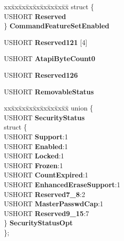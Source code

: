 \begin{DoxyCompactItemize}
\begin{tabbing}
\end{tabbing}\item 
\mbox{\label{struct___i_d_e_n_t_i_f_y___d_a_t_a_a7c0001190945ee865c9445676e84176f}} 
\begin{tabbing}
xx\=xx\=xx\=xx\=xx\=xx\=xx\=xx\=xx\=\kill
struct \{\\
\>USHORT {\bfseries Reserved}\\
\} {\bfseries CommandFeatureSetEnabled}\\

\end{tabbing}\item 
\mbox{\label{struct___i_d_e_n_t_i_f_y___d_a_t_a_a96c3aa79eba3a0c0558bce88a3ea196b}} 
U\+S\+H\+O\+RT {\bfseries Reserved121} \mbox{[}4\mbox{]}
\item 
\mbox{\label{struct___i_d_e_n_t_i_f_y___d_a_t_a_a55df19f7318d27bad2106d0762d8b2ec}} 
U\+S\+H\+O\+RT {\bfseries Atapi\+Byte\+Count0}
\item 
\mbox{\label{struct___i_d_e_n_t_i_f_y___d_a_t_a_a484968cff84e81d7e76e9d0a099a0a08}} 
U\+S\+H\+O\+RT {\bfseries Reserved126}
\item 
\mbox{\label{struct___i_d_e_n_t_i_f_y___d_a_t_a_ad239ea0207c52d65c73d202eb9fc48c4}} 
U\+S\+H\+O\+RT {\bfseries Removable\+Status}
\item 
\mbox{\label{struct___i_d_e_n_t_i_f_y___d_a_t_a_aa4f91fcd48e21fe54b819add87d5254f}} 
\begin{tabbing}
xx\=xx\=xx\=xx\=xx\=xx\=xx\=xx\=xx\=\kill
union \{\\
\>USHORT {\bfseries SecurityStatus}\\
\>struct \{\\
\>\>USHORT {\bfseries Support}:1\\
\>\>USHORT {\bfseries Enabled}:1\\
\>\>USHORT {\bfseries Locked}:1\\
\>\>USHORT {\bfseries Frozen}:1\\
\>\>USHORT {\bfseries CountExpired}:1\\
\>\>USHORT {\bfseries EnhancedEraseSupport}:1\\
\>\>USHORT {\bfseries Reserved7\_8}:2\\
\>\>USHORT {\bfseries MasterPasswdCap}:1\\
\>\>USHORT {\bfseries Reserved9\_15}:7\\
\>\} {\bfseries SecurityStatusOpt}\\
\}; \\


\end{tabbing}
\end{DoxyCompactItemize}
